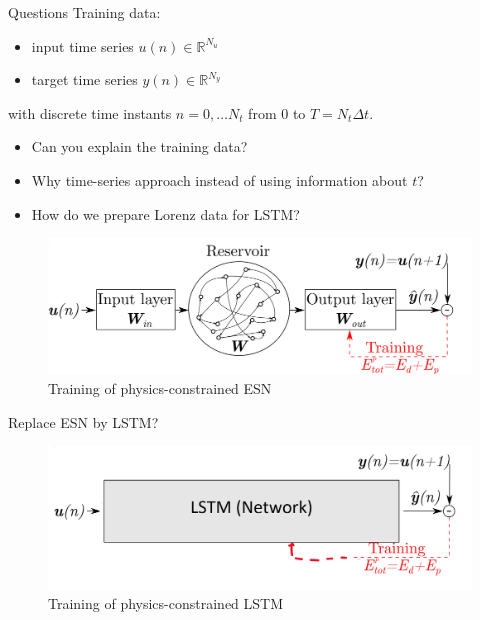 \documentclass{beamer}
\begin{document}
 \begin{frame}{Questions}
 Training data:
\begin{itemize}
    \item input time series $u(n) \in \mathbb{R}^{N_u}$
    \item target time series $y(n) \in \mathbb{R}^{N_y}$
\end{itemize}
with discrete time instants $n=0, \dots N_t$ from $0$ to $T=N_t\Delta t$.
\newline
\begin{itemize}
    \item Can you explain the training data?
    \pause
    \item Why time-series approach instead of using information about $t$?
    \pause
    \item How do we prepare Lorenz data for LSTM?
    
\end{itemize}
    
\end{frame}
 \begin{frame}%
 \begin{figure}
     \centering
     \includegraphics[width=\textwidth]{ESN_training.png}
     \caption{Training of physics-constrained ESN}
 \end{figure}

    
\end{frame}

 \begin{frame}{Replace ESN by LSTM?}
 \begin{figure}
     \centering
     \includegraphics[width=\textwidth]{LSTM_training.png}
     \caption{Training of physics-constrained LSTM}
 \end{figure}

    
\end{frame}
\end{document}
